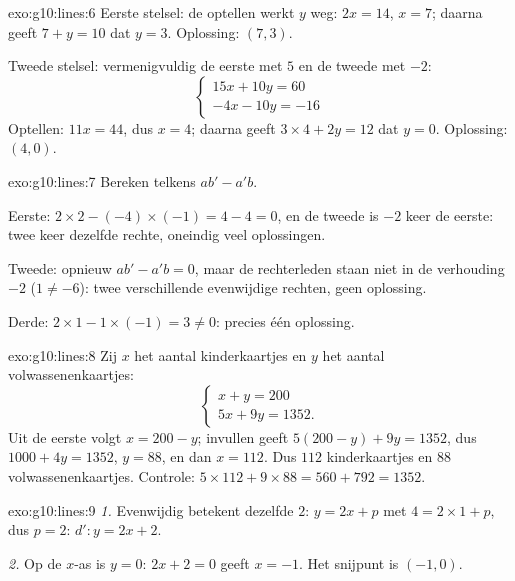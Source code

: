 \begin{solution}{exo:g10:lines:6}
Eerste stelsel: de  optellen werkt $y$ weg: $2x = 14$, $x = 7$;
daarna geeft $7 + y = 10$ dat $y = 3$. Oplossing: $(7, 3)$.

Tweede stelsel: vermenigvuldig de eerste  met $5$ en de tweede
met $-2$:
\[
\begin{cases}
15x + 10y = 60 \\
-4x - 10y = -16
\end{cases}
\]
Optellen: $11x = 44$, dus $x = 4$; daarna geeft $3 \times 4 + 2y = 12$ dat
$y = 0$. Oplossing: $(4, 0)$.
\end{solution}

\begin{solution}{exo:g10:lines:7}
Bereken telkens $ab' - a'b$.

Eerste: $2 \times 2 - (-4) \times (-1) = 4 - 4 = 0$, en de tweede
 is $-2$ keer de eerste: twee keer dezelfde rechte, oneindig veel
oplossingen.

Tweede: opnieuw $ab' - a'b = 0$, maar de rechterleden staan niet in de
verhouding $-2$ ($1 \neq -6$): twee verschillende evenwijdige rechten, geen
oplossing.

Derde: $2 \times 1 - 1 \times (-1) = 3 \neq 0$: precies één oplossing.
\end{solution}

\begin{solution}{exo:g10:lines:8}
Zij $x$ het aantal kinderkaartjes en $y$ het aantal volwassenenkaartjes:
\[
\begin{cases}
x + y = 200 \\
5x + 9y = 1352 .
\end{cases}
\]
Uit de eerste  volgt $x = 200 - y$; invullen geeft
$5(200 - y) + 9y = 1352$, dus $1000 + 4y = 1352$, $y = 88$, en dan
$x = 112$. Dus $112$ kinderkaartjes en $88$ volwassenenkaartjes. Controle:
$5 \times 112 + 9 \times 88 = 560 + 792 = 1352$.
\end{solution}

\begin{solution}{exo:g10:lines:9}
\emph{1.} Evenwijdig betekent dezelfde  $2$:
$y = 2x + p$ met $4 = 2 \times 1 + p$, dus $p = 2$: $d'\colon y = 2x + 2$.

\emph{2.} Op de $x$-as is $y = 0$: $2x + 2 = 0$ geeft $x = -1$. Het snijpunt
is $(-1, 0)$.
\end{solution}

